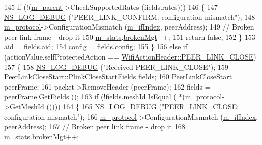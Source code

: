 \begin{DoxyCode}
145           \textcolor{keywordflow}{if} (!(\hyperlink{classns3_1_1dot11s_1_1PeerManagementProtocolMac_a14edf9af29af164f967ccc6e77d8ea03}{m\_parent}->CheckSupportedRates (fields.rates)))
146             \{
147               \hyperlink{group__logging_ga413f1886406d49f59a6a0a89b77b4d0a}{NS\_LOG\_DEBUG} (\textcolor{stringliteral}{"PEER\_LINK\_CONFIRM:  configuration mismatch"});
148               \hyperlink{classns3_1_1dot11s_1_1PeerManagementProtocolMac_afbdd1f31cd54c320267ffb3426559095}{m\_protocol}->ConfigurationMismatch (\hyperlink{classns3_1_1dot11s_1_1PeerManagementProtocolMac_a6127e7b929975cae23d8ef639e254991}{m\_ifIndex}, peerAddress);
149               \textcolor{comment}{// Broken peer link frame - drop it}
150               \hyperlink{classns3_1_1dot11s_1_1PeerManagementProtocolMac_aaaccd87941623a8bff20e8998908b518}{m\_stats}.\hyperlink{structns3_1_1dot11s_1_1PeerManagementProtocolMac_1_1Statistics_a7ec552294be33835a15ec7002fe5d723}{brokenMgt}++;
151               \textcolor{keywordflow}{return} \textcolor{keyword}{false};
152             \}
153           aid = fields.aid;
154           config = fields.config;
155         \}
156       \textcolor{keywordflow}{else} \textcolor{keywordflow}{if} (actionValue.selfProtectedAction == 
      \hyperlink{classns3_1_1WifiActionHeader_a17cfd6c8f685a44e7b7b832cc9a53e83a809630e6f0c535ffe43ea071edacc7fd}{WifiActionHeader::PEER\_LINK\_CLOSE})
157         \{
158           \hyperlink{group__logging_ga413f1886406d49f59a6a0a89b77b4d0a}{NS\_LOG\_DEBUG} (\textcolor{stringliteral}{"Received PEER\_LINK\_CLOSE"});
159           PeerLinkCloseStart::PlinkCloseStartFields fields;
160           PeerLinkCloseStart peerFrame;
161           packet->RemoveHeader (peerFrame);
162           fields = peerFrame.GetFields ();
163           \textcolor{keywordflow}{if} (!fields.meshId.IsEqual ( *(\hyperlink{classns3_1_1dot11s_1_1PeerManagementProtocolMac_afbdd1f31cd54c320267ffb3426559095}{m\_protocol}->GetMeshId ())))
164             \{
165               \hyperlink{group__logging_ga413f1886406d49f59a6a0a89b77b4d0a}{NS\_LOG\_DEBUG} (\textcolor{stringliteral}{"PEER\_LINK\_CLOSE:  configuration mismatch"});
166               \hyperlink{classns3_1_1dot11s_1_1PeerManagementProtocolMac_afbdd1f31cd54c320267ffb3426559095}{m\_protocol}->ConfigurationMismatch (\hyperlink{classns3_1_1dot11s_1_1PeerManagementProtocolMac_a6127e7b929975cae23d8ef639e254991}{m\_ifIndex}, peerAddress);
167               \textcolor{comment}{// Broken peer link frame - drop it}
168               \hyperlink{classns3_1_1dot11s_1_1PeerManagementProtocolMac_aaaccd87941623a8bff20e8998908b518}{m\_stats}.\hyperlink{structns3_1_1dot11s_1_1PeerManagementProtocolMac_1_1Statistics_a7ec552294be33835a15ec7002fe5d723}{brokenMgt}++;

\end{DoxyCode}

